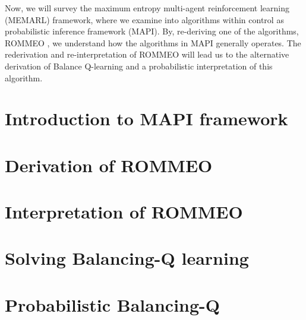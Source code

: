 \label{chapter:chap3}

\begin{miniabstract}
Now, we will survey the maximum entropy multi-agent reinforcement learning (MEMARL) framework, where we examine into algorithms within control as probabilistic inference framework (MAPI). By, re-deriving one of the algorithms, ROMMEO \cite{tian2019regularized}, we understand how the algorithms in MAPI generally operates. The rederivation and re-interpretation of ROMMEO will lead us to the alternative derivation of Balance Q-learning \cite{grau2018balancing} and a probabilistic interpretation of this algorithm.
\end{miniabstract}


\section{Introduction to MAPI framework}


\section{Derivation of ROMMEO}


\section{Interpretation of ROMMEO}


\section{Solving Balancing-Q learning}


\section{Probabilistic Balancing-Q}


